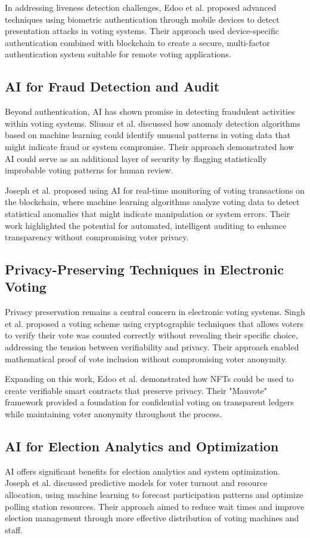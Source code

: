 \documentclass[conference]{IEEEtran}
\begin{document}
In addressing liveness detection challenges, Edoo et al. \cite{b7} proposed advanced techniques using biometric authentication through mobile devices to detect presentation attacks in voting systems. Their approach used device-specific authentication combined with blockchain to create a secure, multi-factor authentication system suitable for remote voting applications.

\subsection{AI for Fraud Detection and Audit}
Beyond authentication, AI has shown promise in detecting fraudulent activities within voting systems. Sliusar et al. \cite{b4} discussed how anomaly detection algorithms based on machine learning could identify unusual patterns in voting data that might indicate fraud or system compromise. Their approach demonstrated how AI could serve as an additional layer of security by flagging statistically improbable voting patterns for human review.

Joseph et al. \cite{b6} proposed using AI for real-time monitoring of voting transactions on the blockchain, where machine learning algorithms analyze voting data to detect statistical anomalies that might indicate manipulation or system errors. Their work highlighted the potential for automated, intelligent auditing to enhance transparency without compromising voter privacy.

\subsection{Privacy-Preserving Techniques in Electronic Voting}
Privacy preservation remains a central concern in electronic voting systems. Singh et al. \cite{b5} proposed a voting scheme using cryptographic techniques that allows voters to verify their vote was counted correctly without revealing their specific choice, addressing the tension between verifiability and privacy. Their approach enabled mathematical proof of vote inclusion without compromising voter anonymity.

Expanding on this work, Edoo et al. \cite{b7} demonstrated how NFTs could be used to create verifiable smart contracts that preserve privacy. Their "Mauvote" framework provided a foundation for confidential voting on transparent ledgers while maintaining voter anonymity throughout the process.

\subsection{AI for Election Analytics and Optimization}
AI offers significant benefits for election analytics and system optimization. Joseph et al. \cite{b6} discussed predictive models for voter turnout and resource allocation, using machine learning to forecast participation patterns and optimize polling station resources. Their approach aimed to reduce wait times and improve election management through more effective distribution of voting machines and staff.
\end{document}

